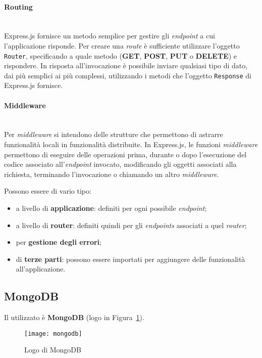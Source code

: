 \paragraph{Routing} \mbox{} \\
Express.js fornisce un metodo semplice per gestire gli \textit{endpoint} a cui l'applicazione risponde. Per creare una \textit{route} è sufficiente utilizzare l'oggetto \texttt{Router}, specificando a quale metodo  (\textbf{GET}, \textbf{POST}, \textbf{PUT} o \textbf{DELETE}) e  rispondere. In risposta all'invocazione è possibile inviare qualsiasi tipo di dato, dai più semplici ai più complessi, utilizzando i metodi che l'oggetto \texttt{Response} di Express.js fornisce.

\paragraph{Middleware} \mbox{} \\
Per \textit{middleware} si intendono delle strutture che permettono di astrarre funzionalità locali in funzionalità distribuite. In Express.js, le funzioni \textit{middleware} permettono di eseguire delle operazioni prima, durante o dopo l'esecuzione del codice associato all'\textit{endpoint} invocato, modificando gli oggetti associati alla richiesta, terminando l'invocazione o chiamando un altro \textit{middleware}.

Possono essere di vario tipo:
\begin{itemize}
\item a livello di \textbf{applicazione}: definiti per ogni possibile \textit{endpoint};
\item a livello di \textbf{router}: definiti quindi per gli \textit{endpoints} associati a quel \textit{router};
\item per \textbf{gestione degli errori};
\item di \textbf{terze parti}: possono essere importati per aggiungere delle funzionalità all'applicazione.
\end{itemize}

\subsection{MongoDB}
Il  utilizzato è \textbf{MongoDB} (logo in Figura~\ref{fig:mongodb}). 

\begin{figure}[hbpc]
\begin{center}
\texttt{[image: mongodb]}
\caption[Logo di MongoDB]{Logo di MongoDB\protect\footnotemark}
\label{fig:mongodb}
\end{center}
\end{figure}

